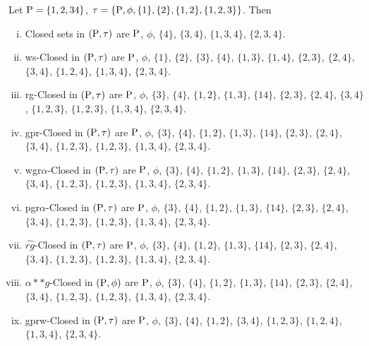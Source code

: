 \begin{exm}\label{exm2.2.15}
Let $\mathrm{P} = \{1, 2, 3 4\}$, $\tau = \{\mathrm{P},\phi, \{1\}, \{2\}, \{1, 2\}, \{1, 2, 3\}\}$. Then 
\begin{enumerate}[(i)]
\item Closed sets in $(\mathrm{P}, \tau)$ are $\mathrm{P}$, $\phi$, $\{4\}$, $\{3, 4\}$, $\{1, 3, 4\}$, $\{2, 3, 4\}$.

\item ws-Closed in $(\mathrm{P}, \tau)$ are $\mathrm{P}$, $\phi$, $\{1\}$, $\{2\}$, $\{3\}$, $\{4\}$, $\{1, 3\}$, $\{1, 4\}$, $\{2, 3\}$, $\{2, 4\}$, $\{3, 4\}$, $\{1, 2, 4\}$, $\{1, 3, 4\}$, $\{2, 3, 4\}$.

\item rg-Closed in $(\mathrm{P}, \tau)$ are $\mathrm{P}$, $\phi$, $\{3\}$, $\{4\}$, $\{1, 2\}$, $\{1, 3\}$, $\{1 4\}$, $\{2, 3\}$, $\{2, 4\}$, $\{3, 4\}$, $\{1, 2, 3\}$, $\{1, 2, 3\}$, $\{1, 3, 4\}$, $\{2, 3, 4\}$.

\item gpr-Closed in $(\mathrm{P}, \tau)$ are $\mathrm{P}$, $\phi$, $\{3\}$, $\{4\}$, $\{1, 2\}$, $\{1, 3\}$, $\{1 4\}$, $\{2, 3\}$, $\{2, 4\}$, $\{3, 4\}$, $\{1, 2, 3\}$, $\{1, 2, 3\}$, $\{1, 3, 4\}$, $\{2, 3, 4\}$.

\item wgr$\alpha$-Closed in $(\mathrm{P}, \tau)$ are $\mathrm{P}$, $\phi$, $\{3\}$, $\{4\}$, $\{1, 2\}$, $\{1, 3\}$, $\{1 4\}$, $\{2, 3\}$, $\{2, 4\}$, $\{3, 4\}$, $\{1, 2, 3\}$, $\{1, 2, 3\}$, $\{1, 3, 4\}$, $\{2, 3, 4\}$.

\item pgr$\alpha$-Closed in $(\mathrm{P}, \tau)$ are $\mathrm{P}$, $\phi$, $\{3\}$, $\{4\}$, $\{1, 2\}$, $\{1, 3\}$, $\{1 4\}$, $\{2, 3\}$, $\{2, 4\}$, $\{3, 4\}$, $\{1, 2, 3\}$, $\{1, 2, 3\}$, $\{1, 3, 4\}$, $\{2, 3, 4\}$.

\item $\widehat{rg}$-Closed in $(\mathrm{P}, \tau)$ are $\mathrm{P}$, $\phi$, $\{3\}$, $\{4\}$, $\{1, 2\}$, $\{1, 3\}$, $\{1 4\}$, $\{2, 3\}$, $\{2, 4\}$, $\{3, 4\}$, $\{1, 2, 3\}$, $\{1, 2, 3\}$, $\{1, 3, 4\}$, $\{2, 3, 4\}$.

\item $\alpha{*}{*} g$-Closed in $(\mathrm{P}, \phi)$ are $\mathrm{P}$, $\phi$, $\{3\}$, $\{4\}$, $\{1, 2\}$, $\{1, 3\}$, $\{1 4\}$, $\{2, 3\}$, $\{2, 4\}$, $\{3, 4\}$, $\{1, 2,3\}$, $\{1, 2, 3\}$, $\{1, 3, 4\}$, $\{2, 3, 4\}$.

\item gprw-Closed in $(\mathrm{P}, \tau)$ are $\mathrm{P}$, $\phi$, $\{3\}$, $\{4\}$, $\{1, 2\}$, $\{3, 4\}$, $\{1, 2, 3\}$, $\{1, 2, 4\}$, $\{1, 3, 4\}$, $\{2, 3,4\}$.


\end{enumerate}
\end{exm}
